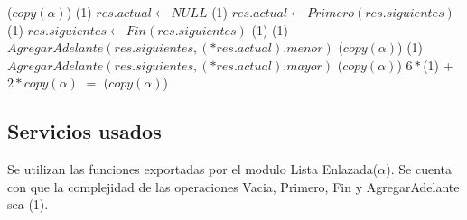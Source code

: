 {   }
{}
{\bigo($copy(\alpha)$)}
{                                              \comment \bigo(1)
        \State $res.actual \gets NULL$                                          \comment \bigo(1)
    \Else
        \State $res.actual \gets Primero(res.siguientes)$                       \comment \bigo(1)
        \State $res.siguientes \gets Fin(res.siguientes)$                       \comment \bigo(1)
                                           \comment \bigo(1)
            \State $AgregarAdelante(res.siguientes, (*res.actual).menor)$       \comment \bigo($copy(\alpha)$)
        \EndIf
                                           \comment \bigo(1)
            \State $AgregarAdelante(res.siguientes, (*res.actual).mayor)$       \comment \bigo($copy(\alpha)$)
        \EndIf
    \EndIf
}
{   $6*$\bigo(1) + $2 * copy(\alpha)$ $=$ \bigo($copy(\alpha)$)}


\subsection{Servicios usados}

Se utilizan las funciones exportadas por el modulo Lista Enlazada($\alpha$).
Se cuenta con que la complejidad de las operaciones Vacia, Primero, Fin y AgregarAdelante
sea \bigo(1).
